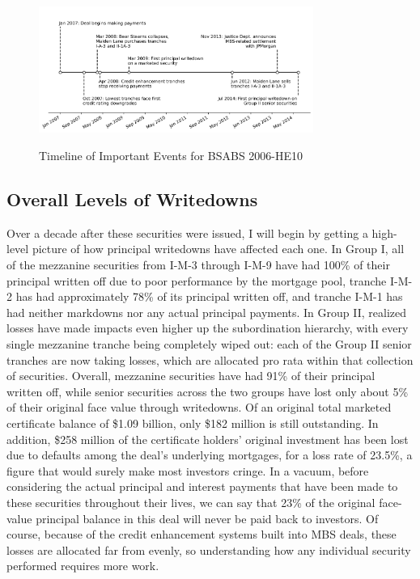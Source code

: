 \documentclass[12pt]{article}
\begin{document}
\begin{figure}[h]
	\centering
	\caption{Timeline of Important Events for BSABS 2006-HE10}
	\includegraphics[width=0.8\textwidth]{../figures/timeline_of_important_events}
	\label{fig:timeline_of_important_events}
\end{figure}

\subsection*{Overall Levels of Writedowns}

Over a decade after these securities were issued, I will begin by getting a high-level picture of how principal writedowns have affected each one. In Group I, all of the mezzanine securities from I-M-3 through I-M-9 have had 100\% of their principal written off due to poor performance by the mortgage pool, tranche I-M-2 has had approximately 78\% of its principal written off, and tranche I-M-1 has had neither markdowns nor any actual principal payments. In Group II, realized losses have made impacts even higher up the subordination hierarchy, with every single mezzanine tranche being completely wiped out: each of the Group II senior tranches are now taking losses, which are allocated pro rata within that collection of securities. Overall, mezzanine securities have had 91\% of their principal written off, while senior securities across the two groups have lost only about 5\% of their original face value through writedowns. Of an original total marketed certificate balance of \$1.09 billion, only \$182 million is still outstanding. In addition, \$258 million of the certificate holders’ original investment has been lost due to defaults among the deal’s underlying mortgages, for a loss rate of 23.5\%, a figure that would surely make most investors cringe. In a vacuum, before considering the actual principal and interest payments that have been made to these securities throughout their lives, we can say that 23\% of the original face-value principal balance in this deal will never be paid back to investors. Of course, because of the credit enhancement systems built into MBS deals, these losses are allocated far from evenly, so understanding how any individual security performed requires more work.
\end{document}
